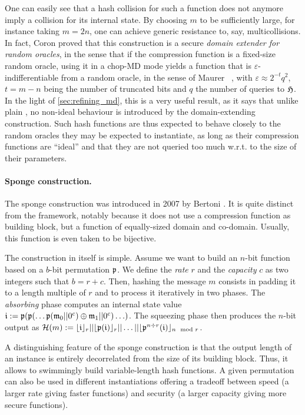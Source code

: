 One can easily see that a hash collision for such a function does not anymore imply a collision for its internal state. By choosing $m$ to be sufficiently large, for instance taking $m = 2n$,
one can achieve generic resistance to, say, multicollisions. In fact, Coron \etal proved that this construction is a secure \emph{domain extender for random oracles}, in the sense that
if the compression function is a fixed-size random oracle, using it in a chop-MD mode yields a function that is $\varepsilon$-indifferentiable from a random oracle, in the sense of Maurer \etal~\cite{DBLP:conf/tcc/MaurerRH04},
with $\varepsilon \approx 2^{-t}q^2$, $t = m - n$ being the number of truncated bits and $q$ the number of queries to $\operatorname{\mathfrak{H}}$. In the light of \autoref{sec:refining_md}, this is a very useful result, as it
says that unlike plain \merkdam, no non-ideal behaviour is introduced by the domain-extending construction. Such hash functions are thus expected to behave closely to the random oracles they may be expected to instantiate, as long as
their compression functions are ``ideal'' and that they are not queried too much w.r.t. to the size of their parameters.

\paragraph{Sponge construction.} The sponge construction was introduced in 2007 by Bertoni \etal \cite{SpongeFunctions}. It is quite distinct from the \merkdam framework, notably because it does not use a compression
function as building block, but a function of equally-sized domain and co-domain. Usually, this function is even taken to be bijective.

The construction in itself is simple. Assume we want to build an $n$-bit function based on a $b$-bit permutation $\operatorname{\mathfrak{p}}$. We define the \emph{rate} $r$ and the \emph{capacity} $c$ as two integers such that
$b = r + c$. Then, hashing the message $m$ consists in padding it to a length multiple of $r$ and to process it iteratively
in two phases. The \emph{absorbing} phase computes an internal state value $\mathfrak{i} := \operatorname{\mathfrak{p}}(\operatorname{\mathfrak{p}}(\ldots\operatorname{\mathfrak{p}}(\mathfrak{m}_0||0^c)\oplus\mathfrak{m}_1||0^c)\ldots)$. The squeezing phase then produces the
$n$-bit output as $\operatorname{\mathcal{H}}(m) := \lfloor\mathfrak{i}\rfloor_r||\lfloor\operatorname{\mathfrak{p}}(\mathfrak{i})\rfloor_r||\ldots||\lfloor\operatorname{\mathfrak{p}}^{n \div r}(\mathfrak{i})\rfloor_{n \mod r}$.

A distinguishing feature of the sponge construction is that the output length of an instance is entirely decorrelated from the size of its building
block. Thus, it allows to swimmingly build variable-length hash functions. A given permutation can also be used in different instantiations offering a tradeoff between speed (a larger rate giving
faster functions) and security (a larger capacity giving more secure functions).

